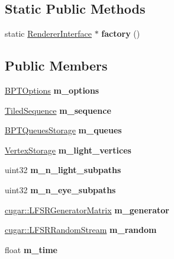 \subsection*{Static Public Methods}
\begin{DoxyCompactItemize}
\item 
\mbox{\label{struct_b_p_t_a731f57cfd10bc96040add0194ecb0110}} 
static \hyperlink{struct_renderer_interface}{Renderer\+Interface} $\ast$ {\bfseries factory} ()
\end{DoxyCompactItemize}
\subsection*{Public Members}
\begin{DoxyCompactItemize}
\item 
\mbox{\label{struct_b_p_t_ad7115878e2a15bc9d343d9b55652a102}} 
\hyperlink{struct_b_p_t_options}{B\+P\+T\+Options} {\bfseries m\+\_\+options}
\item 
\mbox{\label{struct_b_p_t_adbf95be629586410ca1ba36b659f67ea}} 
\hyperlink{struct_tiled_sequence}{Tiled\+Sequence} {\bfseries m\+\_\+sequence}
\item 
\mbox{\label{struct_b_p_t_ae6458130ad5503baf5334ed530d277d0}} 
\hyperlink{struct_b_p_t_queues_storage}{B\+P\+T\+Queues\+Storage} {\bfseries m\+\_\+queues}
\item 
\mbox{\label{struct_b_p_t_abb143bf4bdd945ba511a67a0edf0f1f2}} 
\hyperlink{struct_vertex_storage}{Vertex\+Storage} {\bfseries m\+\_\+light\+\_\+vertices}
\item 
\mbox{\label{struct_b_p_t_acb8257fbaf359d944e02d1e34804badf}} 
uint32 {\bfseries m\+\_\+n\+\_\+light\+\_\+subpaths}
\item 
\mbox{\label{struct_b_p_t_a63ecc30c516c1f31c7676fad57c36fcf}} 
uint32 {\bfseries m\+\_\+n\+\_\+eye\+\_\+subpaths}
\item 
\mbox{\label{struct_b_p_t_a7c7d6ab0d188b4ffc1e515a180724935}} 
\hyperlink{classcugar_1_1_l_f_s_r_generator_matrix}{cugar\+::\+L\+F\+S\+R\+Generator\+Matrix} {\bfseries m\+\_\+generator}
\item 
\mbox{\label{struct_b_p_t_a993669e42e4d4fae747cb5a2c9628ac1}} 
\hyperlink{structcugar_1_1_l_f_s_r_random_stream}{cugar\+::\+L\+F\+S\+R\+Random\+Stream} {\bfseries m\+\_\+random}
\item 
\mbox{\label{struct_b_p_t_aff98f38d27e563b973b0c398c5d6b847}} 
float {\bfseries m\+\_\+time}
\end{DoxyCompactItemize}


